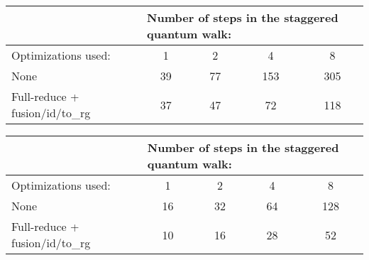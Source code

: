 \begin{table}[H]
\centering
\begin{tabular}{|l|cccc|}
\hline
                               & \multicolumn{4}{l|}{Number of steps in the staggered quantum walk:}                                   \\ \hline
Optimizations used:          & \multicolumn{1}{c|}{1}  & \multicolumn{1}{c|}{2}  & \multicolumn{1}{c|}{4}   & 8   \\ \hline
None            & \multicolumn{1}{c|}{39} & \multicolumn{1}{c|}{77} & \multicolumn{1}{c|}{153} & 305 \\ \hline
Full-reduce + fusion/id/to\_rg & \multicolumn{1}{c|}{37} & \multicolumn{1}{c|}{47} & \multicolumn{1}{c|}{72}  & 118 \\ \hline
\end{tabular}

\end{table}
\caption{Number of total gates in the circuit in relation to the simplification routines used}
\begin{table}[H]
\centering
\begin{tabular}{|l|cccc|}
\hline
                               & \multicolumn{4}{l|}{Number of steps in the staggered quantum walk:}                                  \\ \hline
Optimizations used:          & \multicolumn{1}{c|}{1}  & \multicolumn{1}{c|}{2}  & \multicolumn{1}{c|}{4}  & 8   \\ \hline
None            & \multicolumn{1}{c|}{16} & \multicolumn{1}{c|}{32} & \multicolumn{1}{c|}{64} & 128 \\ \hline
Full-reduce + fusion/id/to\_rg & \multicolumn{1}{c|}{10} & \multicolumn{1}{c|}{16} & \multicolumn{1}{c|}{28} & 52  \\ \hline
\end{tabular}
\end{table}
\caption{T-count in the circuit in relation to the simplification routines used}










